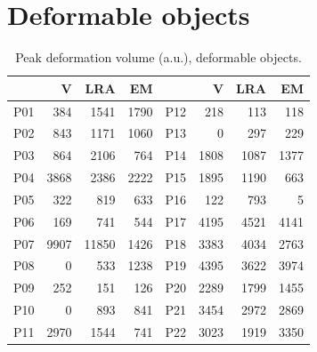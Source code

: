 \documentclass[12pt, a4paper, twoside, openright]{report}
\begin{document}
\section*{Deformable objects}

\begin{table}[ht]
    \centering
    \small
    \caption{Peak deformation volume (a.u.), deformable objects.}
    \label{tab:appB-def-peak}
    \begin{tabular}{@{}lrrr@{\hspace{2em}}lrrr@{}}
        \toprule
            & V    & LRA   & EM   &     & V    & LRA  & EM   \\
        \midrule
        P01 & 384  & 1541  & 1790 & P12 & 218  & 113  & 118  \\
        P02 & 843  & 1171  & 1060 & P13 & 0    & 297  & 229  \\
        P03 & 864  & 2106  & 764  & P14 & 1808 & 1087 & 1377 \\
        P04 & 3868 & 2386  & 2222 & P15 & 1895 & 1190 & 663  \\
        P05 & 322  & 819   & 633  & P16 & 122  & 793  & 5    \\
        P06 & 169  & 741   & 544  & P17 & 4195 & 4521 & 4141 \\
        P07 & 9907 & 11850 & 1426 & P18 & 3383 & 4034 & 2763 \\
        P08 & 0    & 533   & 1238 & P19 & 4395 & 3622 & 3974 \\
        P09 & 252  & 151   & 126  & P20 & 2289 & 1799 & 1455 \\
        P10 & 0    & 893   & 841  & P21 & 3454 & 2972 & 2869 \\
        P11 & 2970 & 1544  & 741  & P22 & 3023 & 1919 & 3350 \\
        \bottomrule
    \end{tabular}
\end{table}
\end{document}
